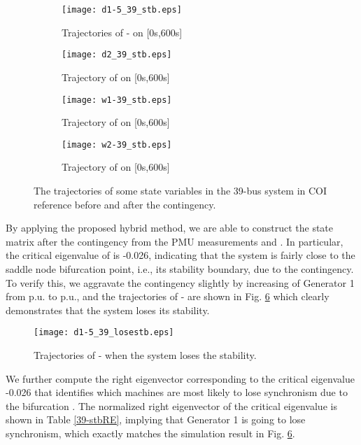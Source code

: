 \documentclass[journal]{IEEEtran}
\begin{document}
\begin{figure}[!ht]
\centering
\begin{subfigure}[t]{0.52\linewidth}
\texttt{[image: d1-5\_39\_stb.eps]}
\caption{Trajectories of - on [0s,600s]}\label{d1-5-39}
\end{subfigure}\begin{subfigure}[t]{0.5\linewidth}
\texttt{[image: d2\_39\_stb.eps]}
\caption{Trajectory of  on [0s,600s]}\label{d2-39-stb}
\end{subfigure}
\begin{subfigure}[t]{0.48\linewidth}
\texttt{[image: w1-39\_stb.eps]}
\caption{Trajectory of  on [0s,600s]}\label{w1-39-stb}
\end{subfigure}\begin{subfigure}[t]{0.5\linewidth}
\texttt{[image: w2-39\_stb.eps]}
\caption{Trajectory of  on [0s,600s]}\label{w2-39-stb}
\end{subfigure}
\caption{The trajectories of some state variables in the 39-bus system in COI reference before and after the contingency.}\label{39-bus-stability}
\end{figure}

By applying the proposed hybrid method, we are able to construct the state matrix  after the contingency from the PMU measurements  and . In particular, the critical eigenvalue of is -0.026, indicating that the system is fairly close to the saddle node bifurcation point, i.e., its stability boundary, due to the contingency. To verify this, we aggravate the contingency slightly by increasing  of Generator 1 from  p.u. to  p.u., and the trajectories of  - are shown in Fig. \ref{d1-5-afterSNB} which clearly demonstrates that the system loses its stability.
\begin{figure}[!ht]
\centering
\texttt{[image: d1-5\_39\_losestb.eps]}\caption{Trajectories of - when the system loses the stability.}\label{d1-5-afterSNB}
\end{figure}

We further compute the right eigenvector corresponding to the critical eigenvalue -0.026 that identifies which machines are most likely to lose synchronism due to the bifurcation \cite{Cutsem:book}\cite{Vournas:1998}. The normalized right eigenvector of the critical eigenvalue is shown in Table \ref{39-stbRE}, implying that Generator 1 is going to lose synchronism, which exactly matches the simulation result in Fig. {\ref{d1-5-afterSNB}}.
\end{document}
